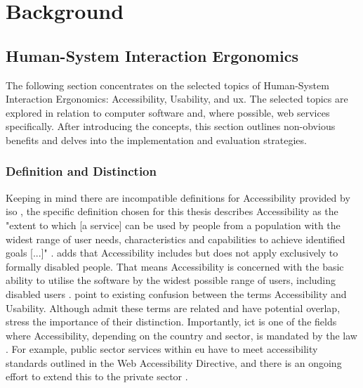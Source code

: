 \chapter{Background}


\section{Human-System Interaction Ergonomics}

The following section concentrates on the selected topics of Human-System Interaction Ergonomics: Accessibility, Usability, and \gls{ux}.
The selected topics are explored in relation to computer software and, where possible, web services specifically.
After introducing the concepts, this section outlines non-obvious benefits and delves into the implementation and evaluation strategies.

\subsection{Definition and Distinction}

Keeping in mind there are incompatible definitions for Accessibility provided by \gls{iso} \parencite{Wegge_Zimmermann_2007}, the specific definition chosen for this thesis describes Accessibility as the "extent to which [a service] can be used by people from a population with the widest range of user needs, characteristics and capabilities to achieve identified goals [...]" \parencite{ISO_9241-11:2018}.
\textcite{ISO_10779:2020} adds that Accessibility includes but does not apply exclusively to formally disabled people.
That means Accessibility is concerned with the basic ability to utilise the software by the widest possible range of users, including disabled users \parencite{Wegge_Zimmermann_2007}.
\textcite{Wegge_Zimmermann_2007} point to existing confusion between the terms Accessibility and Usability.
Although \textcite{Wegge_Zimmermann_2007} admit these terms are related and have potential overlap, \textcite{Wegge_Zimmermann_2007} stress the importance of their distinction.
Importantly, \gls{ict} is one of the fields where Accessibility, depending on the country and sector, is mandated by the law \parencite{Wegge_Zimmermann_2007, Juergen_et_all_2020}.
For example, public sector services within \gls{eu} have to meet accessibility standards outlined in the Web Accessibility Directive, and there is an ongoing effort to extend this to the private sector \parencite{EU_Web_Accessibility}.


